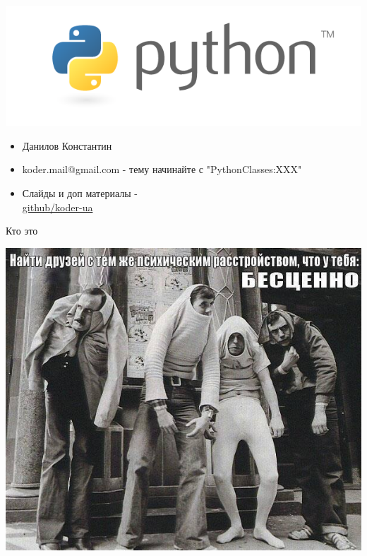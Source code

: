 \documentclass{article}
\begin{document}
\LARGE

\begin{center} \includegraphics[]{images/python-logo-master-v3-TM-flattened.png} \end{center}
\begin{itemize}
    \item Данилов Константин
    \item koder.mail@gmail.com - тему начинайте с "PythonClasses:XXX"
    \item Слайды и доп материалы - \\
            \href{https://github.com/koder-ua/python-classes/tree/master/slides/pdf}{github/koder-ua}
\end{itemize}
\newpage

\begin{center} Кто это \end{center}
\begin{center} \includegraphics{images/mp_crazy.jpg} \end{center}
\newpage
\end{document}
